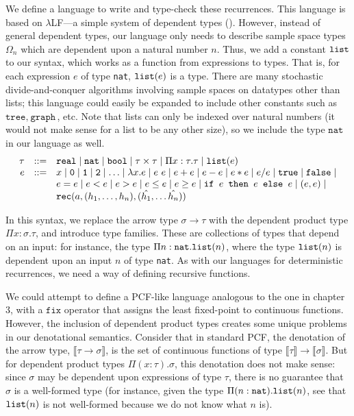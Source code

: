 We define a language to write and type-check these recurrences. This language is based on $\lambda$LF---a simple system of 
dependent types (\cite{Pierce:2005aa}). However, instead of general dependent types, our language only needs to
describe sample space types $\Omega_n$ which are dependent upon a natural number $n$. Thus, we add
a constant $\texttt{list}$ to our syntax, which works as a function from expressions to types. That is, for each 
expression $e$ of type \texttt{nat}, $\texttt{list}(e)$ is a type. There are many stochastic divide-and-conquer algorithms involving sample spaces
on datatypes other than lists; this language could easily be expanded to include other constants such as
 $\texttt{tree}, \ \texttt{graph}$, etc. Note that lists can only be indexed over natural numbers (it would not make 
 sense for a list to be any other size), so we include the type $\texttt{nat}$ in our language as well.
 \[
\begin{array}{rcl}
\tau &::=& \texttt{real} \mid \texttt{nat} \mid \texttt{bool} \mid \tau \times \tau \mid \Pi x:\tau.\tau
\mid \texttt{list}(e) \\
e &::=& x  \mid \texttt{0} \mid \texttt{1} \mid \texttt{2} \mid \dotsc \mid \lambda x.e \mid e \ e \mid e + e \mid e - e \mid  e  *  e \mid e / e \mid \texttt{true} \mid \texttt{false} \mid \\
  && e  =  e \mid e < e \mid e > e \mid e \leq e \mid e \geq e \mid 
     \texttt{if } e \texttt{ then } e \texttt{ else } e \mid (e,e) \mid \\
     && \texttt{rec}(a, (h_1, \ldots, h_n), (\hat{h_1}, \ldots \hat{h_n})) 
\end{array}
\]

In this syntax, we replace the arrow type $\sigma \rightarrow \tau$ with the dependent product type
$\Pi x:\sigma.\tau$, and introduce type families. 
These are collections of types that depend on an input: for instance,
the type $\Pi n:\texttt{nat}.\texttt{list}(n)$, where the type $\texttt{list}(n)$ is dependent upon an input $n$ of type \texttt{nat}.
As with our languages for deterministic recurrences, we need a way of defining recursive functions. 

We could attempt
to define a PCF-like language analogous to the one in chapter 3, with a $\texttt{fix}$ operator that assigns the least
fixed-point to continuous functions. However, the inclusion of dependent product types creates some unique problems
in our denotational semantics. Consider that in standard PCF, the denotation of the arrow type, $\llbracket \tau \rightarrow \sigma \rrbracket$, is the
set of continuous functions of type
$\llbracket \tau \rrbracket \rightarrow \llbracket \sigma \rrbracket$. But for dependent product types $\Pi(x:\tau).\sigma$,
this denotation does not make sense: 
since $\sigma$ may be dependent upon expressions of type $\tau$, there is no guarantee
that $\sigma$ is a well-formed type (for instance, given the type $\Pi(n:\texttt{nat}).\texttt{list}(n)$, see that
$ \texttt{list}(n)$ is not well-formed because we do not know what $n$ is).

